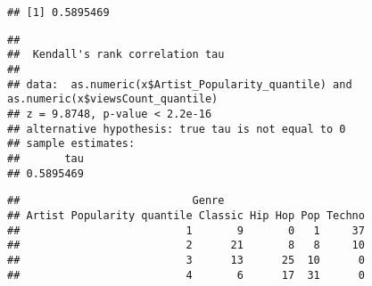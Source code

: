 \documentclass[
]{article}
\newenvironment{Shaded}{\begin{snugshade}}{\end{snugshade}}
\newcommand{\ControlFlowTok}[1]{\textcolor[rgb]{0.13,0.29,0.53}{\textbf{#1}}}
\newcommand{\DataTypeTok}[1]{\textcolor[rgb]{0.13,0.29,0.53}{#1}}
\newcommand{\DecValTok}[1]{\textcolor[rgb]{0.00,0.00,0.81}{#1}}
\newcommand{\KeywordTok}[1]{\textcolor[rgb]{0.13,0.29,0.53}{\textbf{#1}}}
\newcommand{\NormalTok}[1]{#1}
\newcommand{\OperatorTok}[1]{\textcolor[rgb]{0.81,0.36,0.00}{\textbf{#1}}}
\newcommand{\StringTok}[1]{\textcolor[rgb]{0.31,0.60,0.02}{#1}}
\begin{document}
\begin{verbatim}
## [1] 0.5895469
\end{verbatim}

\begin{Shaded}
\end{Shaded}

\begin{verbatim}
## 
##  Kendall's rank correlation tau
## 
## data:  as.numeric(x$Artist_Popularity_quantile) and as.numeric(x$viewsCount_quantile)
## z = 9.8748, p-value < 2.2e-16
## alternative hypothesis: true tau is not equal to 0
## sample estimates:
##       tau 
## 0.5895469
\end{verbatim}

\begin{Shaded}
\end{Shaded}

\begin{verbatim}
##                           Genre
## Artist Popularity quantile Classic Hip Hop Pop Techno
##                          1       9       0   1     37
##                          2      21       8   8     10
##                          3      13      25  10      0
##                          4       6      17  31      0
\end{verbatim}
\end{document}
